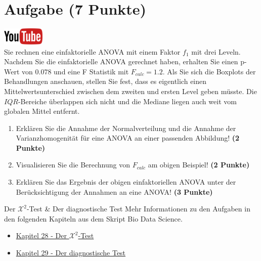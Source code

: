 \documentclass[a4paper, 10pt]{scrartcl}\usepackage[]{graphicx}\usepackage[]{xcolor}
\begin{document}
 
\clearpage

\section{Aufgabe \hfill (7 Punkte)}

\hfill\href{https://youtu.be/M9Uhm67ndxM}{\includegraphics[width =
  2cm]{img/youtube}}\\[1Ex]




Sie rechnen eine einfaktorielle ANOVA mit einem Faktor $f_1$ mit
drei Leveln. Nachdem Sie die einfaktorielle ANOVA gerechnet
haben, erhalten Sie einen p-Wert von $0.078$ und eine F Statistik mit
$F_{calc} = 1.2$. Als Sie sich die Boxplots der Behandlungen anschauen,
stellen Sie fest, dass es eigentlich einen Mittelwertsunterschied zwischen
dem zweiten und ersten Level geben m{\"u}sste. Die
$IQR$-Bereiche {\"u}berlappen sich nicht und die Mediane liegen auch weit vom
globalen Mittel entfernt.


\begin{enumerate}
\item Erkl{\"a}ren Sie die Annahme der Normalverteilung und die Annahme der
  Varianzhomogenit{\"a}t f{\"u}r eine ANOVA an einer passenden Abbildung! \textbf{(2 Punkte)}
\item Visualisieren Sie die Berechnung von $F_{calc}$ am obigen Beispiel!
  \textbf{(2 Punkte)}
\item Erkl{\"a}ren Sie das Ergebnis der obigen einfaktoriellen ANOVA unter der
  Ber{\"u}cksichtigung der Annahmen an eine ANOVA! \textbf{(3 Punkte)}
\end{enumerate}

 
\clearpage
  \begin{graybox}{Der $\mathcal{X}^2$-Test \& Der diagnostische Test}
Mehr Informationen zu den Aufgaben in den folgenden Kapiteln aus dem Skript Bio Data Science.
  \begin{itemize}
  \item \href{https://jkruppa.github.io/stat-tests-chi-test.html}{Kapitel 28 - Der $\mathcal{X}^2$-Test}
  \item \href{https://jkruppa.github.io/stat-tests-diagnostic.html}{Kapitel 29 - Der diagnostische Test}
  \end{itemize}
\end{graybox}
\clearpage
\end{document}
